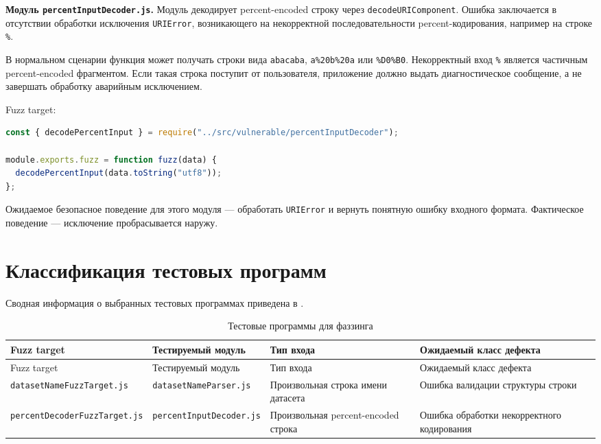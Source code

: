 \textbf{Модуль \texttt{percentInputDecoder.js}.}
Модуль декодирует percent-encoded строку через \texttt{decodeURIComponent}. Ошибка
заключается в отсутствии обработки исключения \texttt{URIError}, возникающего на
некорректной последовательности percent-кодирования, например на строке
\texttt{\%}.

В нормальном сценарии функция может получать строки вида \texttt{abacaba},
\texttt{a\%20b\%20a} или \texttt{\%D0\%B0}. Некорректный вход \texttt{\%} является
частичным percent-encoded фрагментом. Если такая строка поступит от пользователя,
приложение должно выдать диагностическое сообщение, а не завершать обработку
аварийным исключением.

Fuzz target:
\begin{lstlisting}[language=JavaScript,breaklines=true]
const { decodePercentInput } = require("../src/vulnerable/percentInputDecoder");

module.exports.fuzz = function fuzz(data) {
  decodePercentInput(data.toString("utf8"));
};
\end{lstlisting}

Ожидаемое безопасное поведение для этого модуля --- обработать \texttt{URIError}
и вернуть понятную ошибку входного формата. Фактическое поведение --- исключение
пробрасывается наружу.

\section{Классификация тестовых программ} \label{ch1:sec4}

Сводная информация о выбранных тестовых программах приведена в
.

\noindent
\begingroup
\centering
\small
\begin{longtable}[c]{|p{4cm}|p{3.5cm}|p{3.5cm}|p{4cm}|}
    \caption{Тестовые программы для фаззинга}
    \label{tab:fuzz-programs}
    \\
    \hline
    Fuzz target & Тестируемый модуль & Тип входа & Ожидаемый класс дефекта \\ \hline
    \endfirsthead
    \hline
    Fuzz target & Тестируемый модуль & Тип входа & Ожидаемый класс дефекта \\ \hline
    \endhead
    \hline
    \texttt{datasetNameFuzzTarget.js} & \texttt{datasetNameParser.js} & Произвольная строка имени датасета & Ошибка валидации структуры строки \\ \hline
    \texttt{percentDecoderFuzzTarget.js} & \texttt{percentInputDecoder.js} & Произвольная percent-encoded строка & Ошибка обработки некорректного кодирования \\ \hline
\end{longtable}
\normalsize
\endgroup

